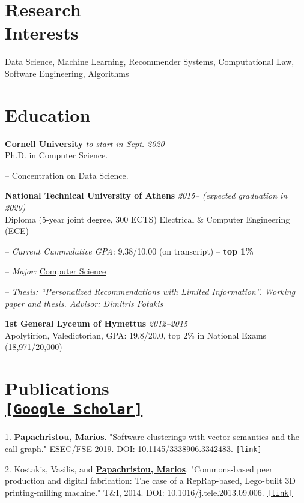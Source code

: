 \documentclass[margin, 10pt]{res}
\newcommand{\field}[2]{\noindent \textbf{#1} \hfill #2 \\}
\begin{document}
\begin{resume}

\section{Research \\ Interests} Data Science, Machine Learning, Recommender Systems, Computational Law, Software Engineering, Algorithms 

\section{Education}
\field {Cornell University} {\emph{to start in Sept. 2020 --}}
Ph.D. in Computer Science. 
\begin{compactitem}
\item[--] Concentration on Data Science.  
\end{compactitem} 
 
\field{National Technical University of Athens}  {\emph{2015-- (expected graduation in 2020)}} 
Diploma (5-year joint degree, 300 ECTS) Electrical \& Computer Engineering (ECE)
\begin{compactitem}
\item[--] \emph{Current Cummulative GPA:} 9.38/10.00 (on transcript) -- \textbf{top 1\%}
\item[--] \emph{Major:} \underline{Computer Science}
\item[--] \emph{Thesis: ``Personalized Recommendations with Limited Information''. Working paper and thesis. Advisor: Dimitris Fotakis}
\end{compactitem} 
\field{1st General Lyceum of Hymettus} {\emph{2012--2015}} 
    Apolytirion, Valedictorian, GPA: 19.8/20.0, top 2\% in National Exams (18,971/20,000)


\section{Publications \\ \href{https://scholar.google.gr/citations?user=T12JO3MAAAAJ&hl=en}{\nolinkurl{[Google Scholar]}}}

\begin{compactitem}
    \item[1.] \underline{\textbf{Papachristou, Marios}}. "Software clusterings with vector semantics and the call graph." ESEC/FSE 2019. DOI: 10.1145/3338906.3342483. \href{https://dl.acm.org/citation.cfm?id=3342483}{\nolinkurl{[link]}}
    \item[2.] Kostakis, Vasilis, and \underline{\textbf{Papachristou, Marios}}. "Commons-based peer production and digital fabrication: The case of a RepRap-based, Lego-built 3D printing-milling machine." T\&I, 2014. DOI: 10.1016/j.tele.2013.09.006. \href{https://bit.ly/2JRoisV}{\nolinkurl{[link]}} \end{compactitem}



\end{resume}
\end{document}
